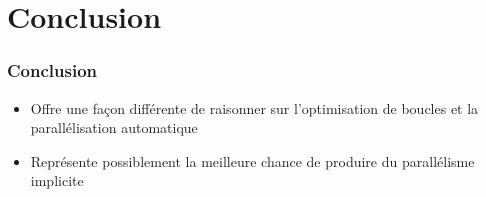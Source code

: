 \documentclass{beamer}
\begin{document}
\section{Conclusion}
\begin{frame}
\frametitle{Conclusion}
\begin{itemize}
\item Offre une façon différente de raisonner sur l'optimisation de boucles et la parallélisation automatique
\item Représente possiblement la meilleure chance de produire du parallélisme implicite
\end{itemize}
\end{frame}
\end{document}
